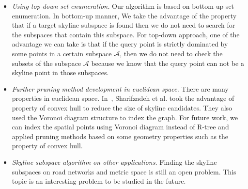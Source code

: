 \begin{itemize}
   
\item \textit{Using top-down set enumeration.} Our algorithm is based on bottom-up set enumeration. In bottom-up manner, We take the advantage of the property that if a target skyline subspace is found then we do not need to search for the subspaces that contain this subspace. For top-down approach, one of the advantage we can take is that if the query point is strictly dominated by some points in a certain subspace $\mathcal{A}$, then we do not need to check the subsets of the subspace $\mathcal{A}$ because we know that the query point can not be a skyline point in those subspaces.

\item \textit{Further pruning method development in euclidean space.} There are many properties in euclidean space. In~\cite{sharifzadeh2006spatial}, Sharifzadeh et al. took the advantage of property of convex hull to reduce the size of skyline candidates. They also used the Voronoi diagram structure to index the graph. For future work, we can index the spatial points using Voronoi diagram instead of R-tree and applied pruning methods based on some geometry properties such as the property of convex hull.

\item \textit{Skyline subspace algorithm on other applications.} Finding the skyline subspaces on road networks and metric space is still an open problem. This topic is an interesting problem to be studied in the future.

\end{itemize}














